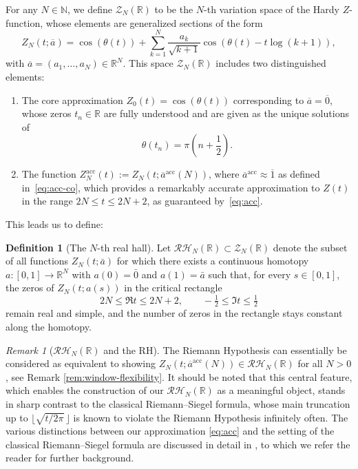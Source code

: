 \documentclass[12pt,reqno]{amsart}
\theoremstyle{plain}
\theoremstyle{definition}
\newtheorem{dfn}{Definition}[section]   %
\theoremstyle{remark}
\newtheorem{rem}{Remark}[section]       %
\begin{document}
For any \( N \in \mathbb{N} \), we define \( \mathcal{Z}_N (\mathbb{R}) \) to be the \( N \)-th variation space of the Hardy \( Z \)-function, whose elements are generalized sections of the form
\begin{equation} 
Z_N(t; \overline{a}) = \cos(\theta(t)) + \sum_{k=1}^{N} \frac{a_k}{\sqrt{k+1}} \cos\left( \theta(t) - t \log(k+1) \right),
\end{equation}
with \( \overline{a} = (a_1, \dots, a_N) \in \mathbb{R}^N \). This space \( \mathcal{Z}_N (\mathbb{R}) \) includes two distinguished elements:
\begin{enumerate}
\item The core approximation \( Z_0(t) = \cos(\theta(t)) \) corresponding to \( \overline{a} = \overline{0} \), whose zeros $t_n \in \mathbb{R}$ are fully understood and are given as the unique solutions of 
\begin{equation}
\theta(t_n)=\pi \left ( n +\frac{1}{2} \right ).  
\end{equation}
\item The function \( Z_N^{\mathrm{acc}}(t) := Z_{N}(t; \overline{a}^{\mathrm{acc}}(N)) \), where \( \overline{a}^{\mathrm{acc}} \approx \overline{1} \) as defined in~\eqref{eq:acc-co}, which provides a remarkably accurate approximation to \( Z(t) \) in the range \( 2N \leq t \leq 2N+2 \), as guaranteed by~\eqref{eq:acc}. 
\end{enumerate}
This leads us to define:
\begin{dfn}[The $N$-th real hall] 
Let \(\mathcal{RH}_N(\mathbb{R}) \subset \mathcal{Z}_N(\mathbb{R})\) denote the subset of all functions \(Z_N(t;\bar a)\)
for which there exists a continuous homotopy \(a:[0,1]\to\mathbb{R}^N\) with \(a(0)=\bar 0\) and \(a(1)=\bar a\) such that,
for every \(s\in[0,1]\), the zeros of \(Z_N(t;a(s))\) in the critical rectangle
\begin{equation}
2N \le \Re t \le 2N+2,\qquad -\tfrac12 \le \Im t \le \tfrac12
\end{equation}
remain real and simple, and the number of zeros in the rectangle stays constant along the homotopy.
\end{dfn}

\begin{rem}[$\mathcal{RH}_N(\mathbb{R})$ and the RH] The Riemann Hypothesis can essentially be considered as equivalent to showing $Z_N (t;\overline{a}^{\mathrm{acc}}(N)) \in \mathcal{RH}_N(\mathbb{R})$ for all $N>0$, see Remark \ref{rem:window-flexibility}. It should be noted that this central feature, which enables the construction of our
$\mathcal{RH}_N(\mathbb{R})$ as a meaningful object, stands in sharp contrast to the
classical Riemann–Siegel formula, whose main truncation up to
$\bigl\lfloor \sqrt{t/2\pi}\,\bigr\rfloor$ is known to violate the
Riemann Hypothesis infinitely often. The various distinctions between our approximation
\eqref{eq:acc} and the setting of the classical Riemann–Siegel formula are discussed in detail
in \cite{J,J4,J5,J3}, to which we refer the reader for further background.

\end{rem}
\end{document}
